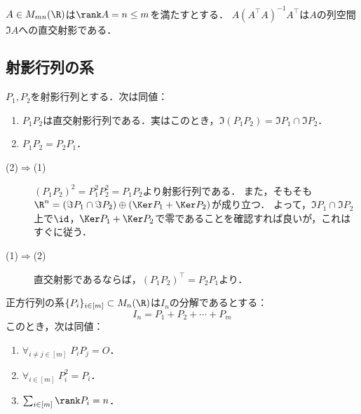 \documentclass[uplatex, dvipdfmx]{jsreport}
\begin{document}
\begin{proposition}[直交射影行列の表示]
    $A\in M_{mn}(\R)$は$\rank A=n\le m$を満たすとする．
    $A(A^\top A)^{-1}A^\top$は$A$の列空間$\Im A$への直交射影である．
\end{proposition}

\subsection{射影行列の系}

\begin{theorem}
    $P_1,P_2$を射影行列とする．次は同値：
    \begin{enumerate}
        \item $P_1P_2$は直交射影行列である．実はこのとき，$\Im(P_1P_2)=\Im P_1\cap\Im P_2$．
        \item $P_1P_2=P_2P_1$．
    \end{enumerate}
\end{theorem}
\begin{Proof}\mbox{}
    \begin{description}
        \item[(2)$\Rightarrow$(1)] $(P_1P_2)^2=P_1^2P_2^2=P_1P_2$より射影行列である．
        また，そもそも$\R^n=(\Im P_1\cap\Im P_2)\oplus(\Ker P_1+\Ker P_2)$が成り立つ．
        よって，$\Im P_1\cap\Im P_2$上で$\id$，$\Ker P_1+\Ker P_2$で零であることを確認すれば良いが，これはすぐに従う．
        \item[(1)$\Rightarrow$(2)] 直交射影であるならば，$(P_1P_2)^\top=P_2P_1$より．
    \end{description}
\end{Proof}

\begin{theorem}
    正方行列の系$\{P_i\}_{i\in[m]}\subset M_n(\R)$は$I_n$の分解であるとする：
    \[I_n=P_1+P_2+\cdots+P_m\]
    このとき，次は同値：
    \begin{enumerate}
        \item $\forall_{i\ne j\in[m]}\;P_iP_j=O$．
        \item $\forall_{i\in[m]}\;P_i^2=P_i$．
        \item $\sum_{i\in[m]}\rank P_i=n$．
    \end{enumerate}
\end{theorem}
\end{document}
